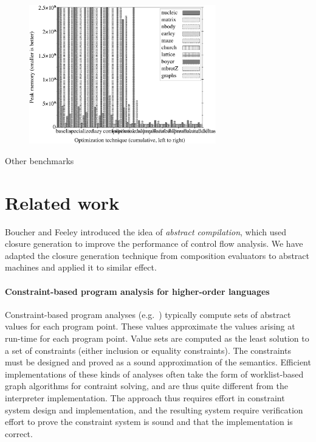 \documentclass[preprint,onecolumn,9pt]{sigplanconf} %
\begin{document}
\begin{figure}
\begin{center}
\includegraphics[width=3.2in]{peak-mem.ps}
\end{center}
\end{figure}





\cite{dvanhorn:Earl2012Introspective}

\cite{dvanhorn:wright-jagannathan-toplas98}

Other benchmarks

\section{Related work}
\label{sec:related}

Boucher and Feeley \cite{dvanhorn:Boucher1996Abstract} introduced the
idea of \emph{abstract compilation}, which used closure generation
\cite{dvanhorn:Feeley1987Using} to improve the performance of control
flow analysis.  We have adapted the closure generation technique from
composition evaluators to abstract machines and applied it to similar
effect.

\paragraph{Constraint-based program analysis for higher-order languages}

Constraint-based program analyses
(e.g.~\cite{dvanhorn:nielson-nielson-popl97,dvanhorn:wright-jagannathan-toplas98,dvanhorn:Meunier2006Modular})
typically compute sets of abstract values for each program point.
These values approximate the values arising at run-time for each
program point.  Value sets are computed as the least solution to a set
of constraints (either inclusion or equality constraints).  The
constraints must be designed and proved as a sound approximation of
the semantics.  Efficient implementations of these kinds of analyses
often take the form of worklist-based graph algorithms for contraint
solving, and are thus quite different from the interpreter
implementation.  The approach thus requires effort in constraint
system design and implementation, and the resulting system require
verification effort to prove the constraint system is sound and that
the implementation is correct.
\end{document}
